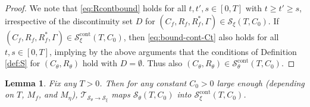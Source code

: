 \documentclass[11pt,letterpaper,reqno]{amsart}
\newtheorem{lem}[thm]{Lemma}
\theoremstyle{definition}
\def\cS{\mathcal{S}}
\def\Ct{C_\theta}
\def\Rt{R_\theta}
\def\Cf{C_f}
\def\Rf{R_f}
\def\trsfrmB{\mathcal{T}_{{\mathcal{S}}_\theta \to \mathcal{S}_\xi}}
\begin{document}
\begin{proof}
We note that \eqref{eq:Rcontbound} holds for all $t,t',s \in [0,T]$ with
$t \geq t' \geq s$, irrespective of the discontinuity set
$D$ for $(\Cf,\Rf,\Rf^*,\Gamma) \in \cS_\xi(T,C_0)$.
If $(\Cf,\Rf,\Rf^*,\Gamma)\in \mathcal{S}^{\mathrm{cont}}_\xi(T,C_0)$, then
\eqref{eq:bound-cont-Ct} also holds for all $t,s \in [0,T]$, implying by the
above arguments that the conditions of Definition \ref{def:S} for
$(C_\theta,R_\theta)$ hold with $D=\emptyset$.
Thus also $(\Ct,\Rt) \in {\mathcal{S}}_\theta^\mathrm{cont}(T,C_0)$.
\end{proof}

\begin{lem} \label{lem:solution-in-space-2}
Fix any $T>0$. Then for any constant $C_0>0$ large enough (depending on $T$,
$M_f$, and $M_\eta$), $\trsfrmB$ maps ${\mathcal{S}}_\theta(T,C_0)$ into
$\mathcal{S}^{\mathrm{cont}}_\xi(T,C_0)$.
\end{lem}
\end{document}
